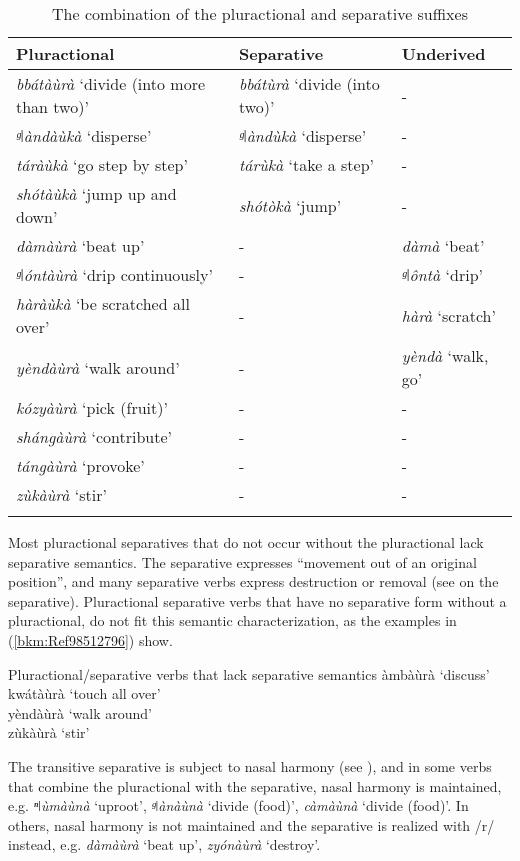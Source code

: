\begin{table}
\label{bkm:Ref489452423}\caption{\label{tab:6:9}The combination of the pluractional and separative suffixes}
\begin{tabularx}{\textwidth}{Qll}
\lsptoprule
Pluractional & Separative & Underived\\
\midrule
\textit{bbátàùrà} ‘divide (into more than two)’ & \textit{bbátùrà} ‘divide (into two)’ & -\\
\textit{ᵍǀàndàùkà} ‘disperse’ & \textit{ᵍǀàndùkà} ‘disperse’ & -\\
\textit{táràùkà} ‘go step by step’ & \textit{tárùkà} ‘take a step’ & -\\
\textit{shótàùkà} ‘jump up and down’ & \textit{shótòkà} ‘jump’ & -\\
\textit{dàmàùrà} ‘beat up’ & - & \textit{dàmà} ‘beat’\\
\textit{ᵍǀóntàùrà} ‘drip continuously’ & - & \textit{ᵍǀôntà} ‘drip’\\
\textit{hàràùkà} ‘be scratched all over’ & - & \textit{hàrà} ‘scratch’\\
\textit{yèndàùrà} ‘walk around’ & - & \textit{yèndà} ‘walk, go’\\
\textit{kózyàùrà} ‘pick (fruit)’ & - & -\\
\textit{shángàùrà} ‘contribute’ & - & -\\
\textit{tángàùrà} ‘provoke’ & - & -\\
\textit{zùkàùrà} ‘stir’ & - & -\\
\lspbottomrule
\end{tabularx}
\end{table}

Most pluractional separatives that do not occur without the pluractional lack separative semantics. The separative expresses “movement out of an original position”, and many separative verbs express destruction or removal (see  on the separative). Pluractional separative verbs that have no separative form without a pluractional, do not fit this semantic characterization, as the examples in (\ref{bkm:Ref98512796}) show.

\newpage
\ea
\label{bkm:Ref98512796}
Pluractional/separative verbs that lack separative semantics
\ea
àmbàùrà    ‘discuss’\\
\ex
kwátàùrà    ‘touch all over’\\
\ex
yèndàùrà    ‘walk around’\\
\ex
zùkàùrà    ‘stir’
\z\z

The transitive separative is subject to nasal harmony (see ), and in some verbs that combine the pluractional with the separative, nasal harmony is maintained, e.g. \textit{ⁿǀùmàùnà} ‘uproot’, \textit{ᵍ}\textit{ǀànàùnà} ‘divide (food)’, \textit{càmàùnà} ‘divide (food)’. In others, nasal harmony is not maintained and the separative is realized with /r/ instead, e.g. \textit{dàmàùrà} ‘beat up’, \textit{zyónàùrà} ‘destroy’.

